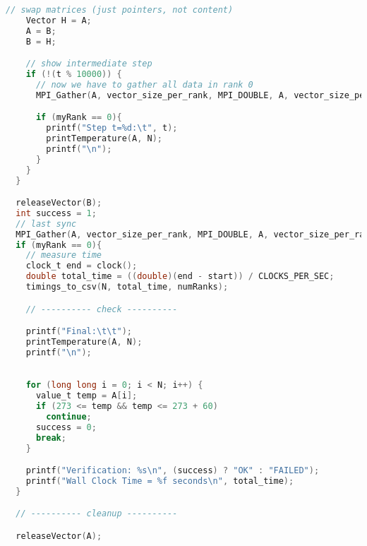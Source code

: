 \documentclass[UTF-8]{article}
\begin{document}
\begin{itemize}
\begin{enumerate}[label=\textbf{\arabic *)}]
\begin{lstlisting}[language=c]
    // swap matrices (just pointers, not content)
    Vector H = A;
    A = B;
    B = H;

    // show intermediate step
    if (!(t % 10000)) {
      // now we have to gather all data in rank 0
      MPI_Gather(A, vector_size_per_rank, MPI_DOUBLE, A, vector_size_per_rank, MPI_DOUBLE, 0, MPI_COMM_WORLD);

      if (myRank == 0){
        printf("Step t=%d:\t", t);
        printTemperature(A, N);
        printf("\n");
      }
    }
  }

  releaseVector(B);
  int success = 1;
  // last sync
  MPI_Gather(A, vector_size_per_rank, MPI_DOUBLE, A, vector_size_per_rank, MPI_DOUBLE, 0, MPI_COMM_WORLD);
  if (myRank == 0){
    // measure time
    clock_t end = clock();
    double total_time = ((double)(end - start)) / CLOCKS_PER_SEC;
    timings_to_csv(N, total_time, numRanks);

    // ---------- check ----------

    printf("Final:\t\t");
    printTemperature(A, N);
    printf("\n");

    
    for (long long i = 0; i < N; i++) {
      value_t temp = A[i];
      if (273 <= temp && temp <= 273 + 60)
        continue;
      success = 0;
      break;
    }

    printf("Verification: %s\n", (success) ? "OK" : "FAILED");
    printf("Wall Clock Time = %f seconds\n", total_time);
  }

  // ---------- cleanup ----------

  releaseVector(A);


\end{lstlisting}
\end{enumerate}
\end{itemize}
\end{document}
